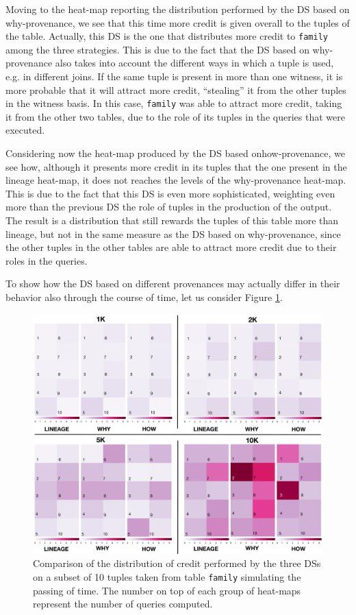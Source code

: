 Moving to the heat-map reporting the distribution performed by the DS based on why-provenance, we see that this time more credit is given overall to the tuples of the table. Actually, this DS is the one that distributes more credit to \texttt{family} among the three strategies. 
This is due to the fact that the DS based on why-provenance also takes into account the different ways in which a tuple is used, e.g. in different joins. If the same tuple is present in more than one witness, it is more probable that it will attract more credit, ``stealing'' it from the other tuples in the witness basis. In this case, \texttt{family} was able to attract more credit, taking it from the other two tables, due to the role of its tuples in the queries that were executed.

Considering now the heat-map produced by the DS based onhow-provenance, we see how, although it presents more credit in its tuples that the one present in the lineage heat-map, it does not reaches the levels of the why-provenance heat-map.
This is due to the fact that this DS is even more sophisticated, weighting even more than the previous DS the role of tuples in the production of the output. 
The result is a distribution that still rewards the tuples of this table more than lineage, but not in the same measure as the DS based on why-provenance, since the other tuples in the other tables are able to attract more credit due to their roles in the queries. 


To show how the DS based on different provenances may actually differ in their behavior also through the course of time, let us consider Figure \ref{fig:comparison}.

\begin{figure}[t]
  \includegraphics[width=\textwidth]{figures/comparison_2}
  \caption{Comparison of the distribution of credit performed by the three DSs on a subset of 10 tuples taken from table \texttt{family} simulating the passing of time. The number on top of each group of heat-maps represent the number of queries computed.}
  \label{fig:comparison}
\end{figure}

